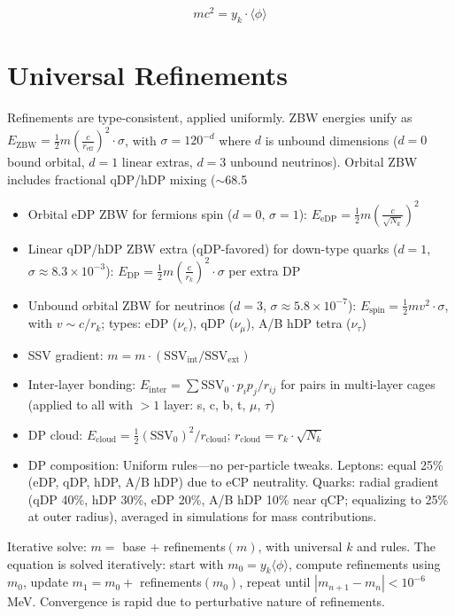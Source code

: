 \documentclass{article}
\begin{document}
\[
m c^2 = y_k \cdot \langle\phi\rangle
\]

\section{Universal Refinements}

Refinements are type-consistent, applied uniformly. ZBW energies unify as $E_{\text{ZBW}} = \frac{1}{2} m \left( \frac{c}{r_{\text{eff}}} \right)^2 \cdot \sigma$, with $\sigma = 120^{-d}$ where $d$ is unbound dimensions ($d=0$ bound orbital, $d=1$ linear extras, $d=3$ unbound neutrinos). Orbital ZBW includes fractional qDP/hDP mixing ($\sim$68.5%
\begin{itemize}
\item Orbital eDP ZBW for fermions spin ($d=0$, $\sigma=1$): $E_{\text{eDP}} = \frac{1}{2} m \left( \frac{c}{\sqrt{N_k}} \right)^2$
\item Linear qDP/hDP ZBW extra (qDP-favored) for down-type quarks ($d=1$, $\sigma \approx 8.3 \times 10^{-3}$): $E_{\text{DP}} = \frac{1}{2} m \left( \frac{c}{r_k} \right)^2 \cdot \sigma$ per extra DP
\item Unbound orbital ZBW for neutrinos ($d=3$, $\sigma \approx 5.8 \times 10^{-7}$): $E_{\text{spin}} = \frac{1}{2} m v^2 \cdot \sigma$, with $v \sim c / r_k$; types: eDP ($\nu_e$), qDP ($\nu_\mu$), A/B hDP tetra ($\nu_\tau$)
\item SSV gradient: $m = m \cdot (\text{SSV}_{\text{int}} / \text{SSV}_{\text{ext}})$
\item Inter-layer bonding: $E_{\text{inter}} = \sum \text{SSV}_0 \cdot p_i p_j / r_{ij}$ for pairs in multi-layer cages (applied to all with $>1$ layer: s, c, b, t, $\mu$, $\tau$)
\item DP cloud: $E_{\text{cloud}} = \frac{1}{2} (\text{SSV}_0)^2 / r_{\text{cloud}}$; $r_{\text{cloud}} = r_k \cdot \sqrt{N_k}$
\item DP composition: Uniform rules—no per-particle tweaks. Leptons: equal 25\% (eDP, qDP, hDP, A/B hDP) due to eCP neutrality. Quarks: radial gradient (qDP 40\%, hDP 30\%, eDP 20\%, A/B hDP 10\% near qCP; equalizing to 25\% at outer radius), averaged in simulations for mass contributions.
\end{itemize}

Iterative solve: $m =$ base $+$ refinements$(m)$, with universal $k$ and rules. The equation is solved iteratively: start with $m_0 = y_k \langle\phi\rangle$, compute refinements using $m_0$, update $m_1 = m_0 +$ refinements$(m_0)$, repeat until $|m_{n+1} - m_n| < 10^{-6}$ MeV. Convergence is rapid due to perturbative nature of refinements.
\end{document}
